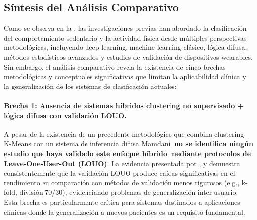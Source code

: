 
\subsection{Síntesis del Análisis Comparativo}
\label{subsec:sintesis_comparativa}

Como se observa en la , las investigaciones previas han abordado la clasificación del comportamiento sedentario y la actividad física desde múltiples perspectivas metodológicas, incluyendo deep learning, machine learning clásico, lógica difusa, métodos estadísticos avanzados y estudios de validación de dispositivos wearables. Sin embargo, el análisis comparativo revela la existencia de cinco brechas metodológicas y conceptuales significativas que limitan la aplicabilidad clínica y la generalización de los sistemas de clasificación actuales:


\paragraph{Brecha 1: Ausencia de sistemas híbridos clustering no supervisado + lógica difusa con validación LOUO.}

A pesar de la existencia de un precedente metodológico \cite{Goncalves2021} que combina clustering K-Means con un sistema de inferencia difusa Mamdani, \textbf{no se identifica ningún estudio que haya validado este enfoque híbrido mediante protocolos de Leave-One-User-Out (LOUO)}. La evidencia presentada por \cite{Rehman2024LOSO}, \cite{Mathew2024LOSO} y \cite{Bassani2025DLHAR} demuestra consistentemente que la validación LOUO produce caídas significativas en el rendimiento en comparación con métodos de validación menos rigurosos (e.g., k-fold, división 70/30), evidenciando problemas de generalización inter-usuario. Esta brecha es particularmente crítica para sistemas destinados a aplicaciones clínicas donde la generalización a nuevos pacientes es un requisito fundamental.

